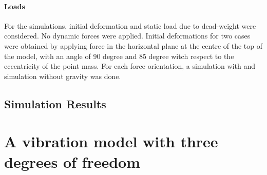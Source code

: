 \documentclass{article}
\begin{document}
\paragraph{Loads}
For the simulations, initial deformation and static load due to dead-weight were considered. No dynamic forces were applied. Initial deformations for two cases were obtained by applying force in the horizontal plane at the centre of the top of the model, with an angle of 90 degree and 85 degree witch respect to the eccentricity of the point mass. For each force orientation, a simulation with and simulation without gravity was done. 


\subsection{Simulation Results}



\clearpage

\section{A vibration model with three degrees of freedom}
\label{sec:3dof}
\end{document}
